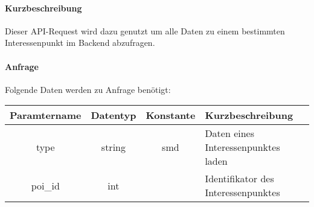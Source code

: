 \paragraph{Kurzbeschreibung}Dieser API-Request wird dazu genutzt um alle Daten zu einem bestimmten Interessenpunkt im Backend abzufragen.
\paragraph{Anfrage}Folgende Daten werden zu Anfrage benötigt:
\begin{table}[H]
	\begin{tabular}{|c|c|c|p{6.5cm}|}
		\hline
		\textbf{Paramtername} & \textbf{Datentyp} & \textbf{Konstante} & \textbf{Kurzbeschreibung}                                                                                               \\ \hline
		type                & string            & smd                & Daten eines Interessenpunktes laden \\ \hline
		poi\_id             & int               &                    & Identifikator des Interessenpunktes \\ \hline
	\end{tabular}
\end{table}
